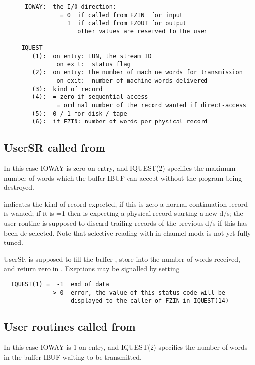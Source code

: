 {\begin{verbatim}
      IOWAY:  the I/O direction:
                = 0  if called from FZIN  for input
                  1  if called from FZOUT for output
                     other values are reserved to the user

     IQUEST
        (1):  on entry: LUN, the stream ID
               on exit:  status flag
        (2):  on entry: the number of machine words for transmission
               on exit:  number of machine words delivered
        (3):  kind of record
        (4):  = zero if sequential access
               = ordinal number of the record wanted if direct-access
        (5):  0 / 1 for disk / tape
        (6):  if FZIN: number of words per physical record

\end{verbatim}

\subsection*{UserSR called from }

In this case IOWAY is zero on entry, and IQUEST(2) specifies
the maximum number of words which the buffer IBUF can accept
without the program being destroyed.

 indicates the kind of record expected,
if this is zero a normal continuation record is wanted;
if it is =1 then  is expecting a physical record
starting a new d/s;
the user routine is supposed to discard trailing records
of the previous d/s if this has been de-selected.
Note that selective reading with  in channel mode
is not yet fully tuned.

UserSR is supposed to fill the buffer ,
store into  the number of words received,
and return zero in .
Exeptions may be signalled by setting
\begin{verbatim}
  IQUEST(1) =  -1  end of data
              > 0  error, the value of this status code will be
                   displayed to the caller of FZIN in IQUEST(14)
\end{verbatim}

\subsection*{User routines called from }

In this case IOWAY is 1 on entry, and IQUEST(2) specifies
the number of words in the buffer IBUF waiting to be transmitted.

}
